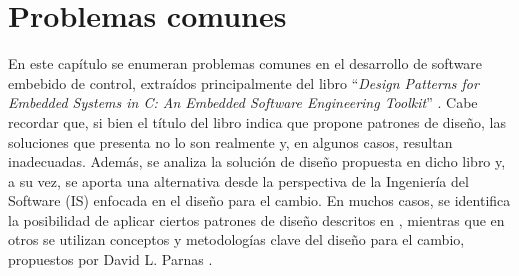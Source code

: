 

%
%

%


\chapter{Problemas comunes}
\label{problemasComunes}

En este capítulo se enumeran problemas comunes en el desarrollo de software embebido de control, extraídos principalmente del libro ``\textit{Design Patterns for Embedded Systems in C: An Embedded Software Engineering Toolkit}'' \cite{douglass}. Cabe recordar que, si bien el título del libro indica que propone patrones de diseño, las soluciones que presenta no lo son realmente y, en algunos casos, resultan inadecuadas. Además, se analiza la solución de diseño propuesta en dicho libro y, a su vez, se aporta una alternativa desde la perspectiva de la Ingeniería del Software (\gls{IS}) enfocada en el diseño para el cambio. En muchos casos, se identifica la posibilidad de aplicar ciertos patrones de diseño descritos en \cite{Gamma:1995:DPE:186897}, mientras que en otros se utilizan conceptos y metodologías clave del diseño para el cambio, propuestos por David L. Parnas \cite{Parnas02, Parnas1972, parnas1977abstract}.


